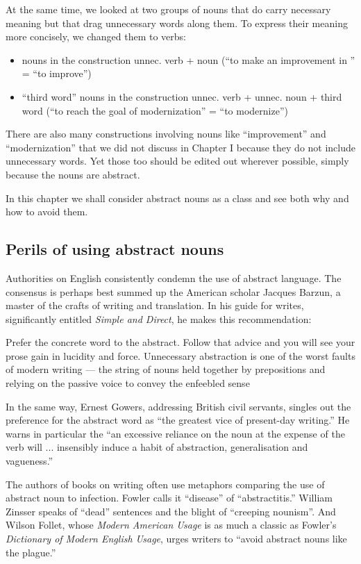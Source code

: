 \documentclass{article}
\begin{document}
At the same time, we looked at two groups of nouns that do carry necessary meaning but that drag unnecessary words along them. To express their meaning more concisely, we changed them to verbs:

\begin{itemize}
  \item nouns in the construction unnec. verb + noun (``to make an improvement in '' = ``to improve'')
  \item ``third word'' nouns in the construction unnec. verb + unnec. noun + third word (``to reach the goal of modernization'' = ``to modernize'')
\end{itemize}

There are also many constructions involving nouns like ``improvement'' and ``modernization'' that we did not discuss in Chapter I because they do not include unnecessary words. Yet those too should be edited out wherever possible, simply because the nouns are abstract.

In this chapter we shall consider abstract nouns as a class and see both why and how to avoid them. 


\subsection{Perils of using abstract nouns}

Authorities on English consistently condemn the use of abstract language. The consensus is perhaps best summed up the American scholar Jacques Barzun, a master of the crafts of writing and translation. In his guide for writes, significantly entitled \emph{Simple and Direct}, he makes this recommendation:

Prefer the concrete word to the abstract. Follow that advice and you will see your prose gain in lucidity and force. Unnecessary abstraction is one of the worst faults of modern writing --- the string of nouns held together by prepositions and relying on the passive voice to convey the enfeebled sense

In the same way, Ernest Gowers, addressing British civil servants, singles out the preference for the abstract word as ``the greatest vice of present-day writing.'' He warns in particular the ``an excessive reliance on the noun at the expense of the verb will ... insensibly induce a habit of abstraction, generalisation and vagueness.''

The authors of books on writing often use metaphors comparing the use of abstract noun to infection. Fowler calls it ``disease'' of ``abstractitis.'' William Zinsser speaks of ``dead'' sentences and the blight of ``creeping nounism''. And Wilson Follet, whose \emph{Modern American Usage} is as much a classic as Fowler's \emph{Dictionary of Modern English Usage}, urges writers 
to ``avoid abstract nouns like the plague.''
\end{document}
